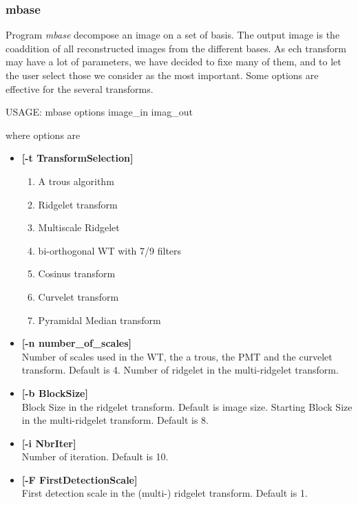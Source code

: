 \documentclass[11pt,a4paper]{article}
\begin{document}
\subsubsection{mbase}

Program {\em mbase} decompose an image on a set of basis.
The output image is the coaddition of all reconstructed images from
the different bases. As ech transform may have a lot of parameters,
we have decided to fixe many of them, and to let the user select those
we consider as the most important. Some options are effective for the
several transforms.

\begin{center}
 USAGE: mbase options image\_in imag\_out
\end{center}
where options are
 
\begin{itemize}
 \item {\bf [-t TransformSelection]}
\begin{enumerate}
\item A trous algorithm
\item Ridgelet transform
\item Multiscale Ridgelet
\item bi-orthogonal WT with 7/9 filters
\item Cosinus transform
\item Curvelet transform
\item Pyramidal Median transform
\end{enumerate}

\item {\bf [-n number\_of\_scales]} \\
Number of scales used in the WT, the a trous, 
the PMT and the curvelet transform. Default is 4.
Number of ridgelet in the multi-ridgelet transform.

\item {\bf [-b BlockSize]}  \\
 Block Size in the ridgelet transform.
Default is image size.  Starting Block Size in the multi-ridgelet transform.
Default is 8. 

\item {\bf [-i NbrIter]}  \\
Number of iteration. Default is 10.

\item {\bf [-F FirstDetectionScale]} \\
First detection scale in the (multi-) ridgelet transform.
Default is 1. 


\end{itemize}
\end{document}
